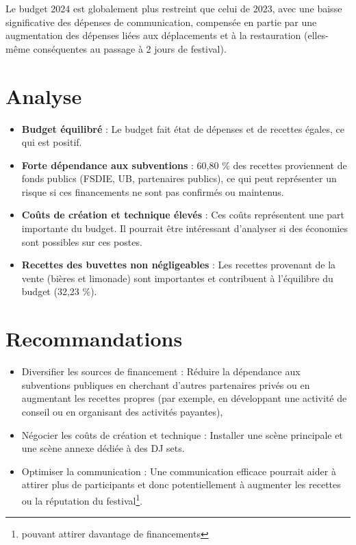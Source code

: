 \documentclass[12pt,a4paper]{report}
\begin{document}
Le budget 2024 est globalement plus restreint que celui de 2023, avec une baisse significative des dépenses de communication, compensée en partie par une augmentation des dépenses liées aux déplacements et à la restauration (elles-même conséquentes au passage à 2 jours de festival).

\section{Analyse}
\begin{itemize}
\item \textbf{Budget équilibré} : Le budget fait état de dépenses et de recettes égales, ce qui est positif.
\item \textbf{Forte dépendance aux subventions} : 60,80 \% des recettes proviennent de fonds publics (FSDIE, UB, partenaires publics), ce qui peut représenter un risque si ces financements ne sont pas confirmés ou maintenus.
\item \textbf{Coûts de création et technique élevés} : Ces coûts représentent une part importante du budget. Il pourrait être intéressant d'analyser si des économies sont possibles sur ces postes.
\item \textbf{Recettes des buvettes non négligeables} : Les recettes provenant de la vente (bières et limonade) sont importantes et contribuent à l'équilibre du budget (32,23 \%).
\end{itemize}

\section{Recommandations}
\begin{itemize}
\item Diversifier les sources de financement : Réduire la dépendance aux subventions publiques en cherchant d'autres partenaires privés ou en augmentant les recettes propres (par exemple, en développant une activité de conseil ou en organisant des activités payantes),
\item Négocier les coûts de création et technique : Installer une scène principale et une scène annexe dédiée à des DJ sets.
\item Optimiser la communication : Une communication efficace pourrait aider à attirer plus de participants et donc potentiellement à augmenter les recettes ou la réputation du festival\footnote{pouvant attirer davantage de financements}.
\end{itemize}
\end{document}
